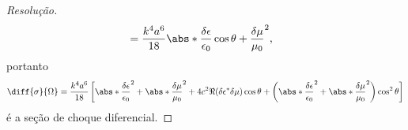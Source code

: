 \begin{proof}[Resolução]
\begin{align*}
                                      &= \frac{k^4 a^6}{18} \abs*{\frac{\delta \epsilon}{\epsilon_0} \cos\theta + \frac{\delta \mu}{\mu_0}}^2,
   \end{align*}
   portanto
   \begin{equation*}
      \diff{\sigma}{\Omega} = \frac{k^4 a^6}{18}\left[\abs*{\frac{\delta \epsilon}{\epsilon_0}}^2 + \abs*{\frac{\delta \mu}{\mu_0}}^2 + 4c^2\Re(\delta \epsilon^* \delta \mu)\cos\theta + \left(\abs*{\frac{\delta \epsilon}{\epsilon_0}}^2 + \abs*{\frac{\delta \mu}{\mu_0}}^2\right)\cos^2\theta\right]
   \end{equation*}
   é a seção de choque diferencial.
\end{proof}
